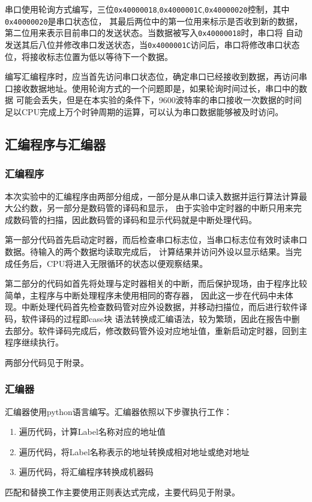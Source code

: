 \documentclass{ctexart}
\begin{document}
			串口使用轮询方式编写，三位\verb"0x40000018",\verb"0x4000001C",\verb"0x40000020"控制，其中\verb"0x40000020"是串口状态位，
			其最后两位中的第一位用来标示是否收到新的数据，第二位用来表示目前串口的发送状态。当数据被写入\verb"0x40000018"时，串口将
			自动发送其后八位并修改串口发送状态，当\verb"0x4000001C"访问后，串口将修改串口状态位，将接收标志位置为低以等待下一个数据。

			编写汇编程序时，应当首先访问串口状态位，确定串口已经接收到数据，再访问串口接收数据地址。使用轮询方式的一个问题即是，如果轮询时间过长，串口中的数据
			可能会丢失，但是在本实验的条件下，9600波特率的串口接收一次数据的时间足以CPU完成上万个时钟周期的运算，可以认为串口数据能够被及时访问。


		\subsection{汇编程序与汇编器}
		\subsubsection{汇编程序}
			本次实验中的汇编程序由两部分组成，一部分是从串口读入数据并运行算法计算最大公约数，另一部分是数码管的译码和显示，
			由于实验中定时器的中断只用来完成数码管的扫描，因此数码管的译码和显示代码就是中断处理代码。

			第一部分代码首先启动定时器，而后检查串口标志位，当串口标志位有效时读串口数据。待输入的两个数据均读取完成后，
			计算结果并访问外设以显示结果。当完成任务后，CPU将进入无限循环的状态以便观察结果。

			第二部分的代码如首先将处理与定时器相关的中断，而后保护现场，由于程序比较简单，主程序与中断处理程序未使用相同的寄存器，
			因此这一步在代码中未体现。中断处理代码首先检查数码管对应外设数据，并移动扫描位，而后进行软件译码，软件译码的过程即case块
			语法转换成汇编语法，较为繁琐，因此在报告中删去部分。软件译码完成后，修改数码管外设对应地址值，重新启动定时器，回到主程序继续执行。

			两部分代码见于附录。


		\subsubsection{汇编器}
			汇编器使用python语言编写。汇编器依照以下步骤执行工作：
			\begin{enumerate}
				\item 遍历代码，计算Label名称对应的地址值
				\item 遍历代码，将Label名称表示的地址转换成相对地址或绝对地址
				\item 遍历代码，将汇编程序转换成机器码
			\end{enumerate}
			匹配和替换工作主要使用正则表达式完成，主要代码见于附录。
\end{document}
